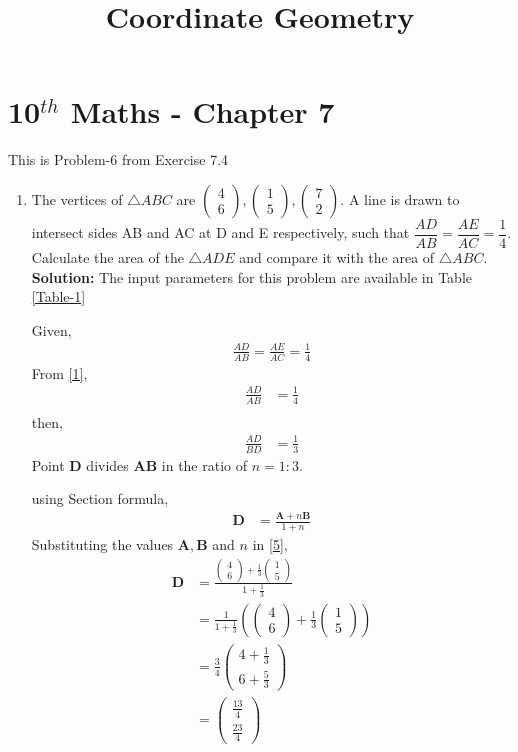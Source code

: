 \documentclass[12pt]{article}
\providecommand{\brak}[1]{\ensuremath{\left(#1\right)}}
\newcommand{\solution}{\noindent \textbf{Solution: }}
\newcommand{\myvec}[1]{\ensuremath{\begin{pmatrix}#1\end{pmatrix}}}
\let\vec\mathbf
\begin{document}
\begin{center}
\title{\textbf{Coordinate Geometry}}
\date{\vspace{-5ex}} %
\maketitle
\end{center}
\setcounter{page}{1}
\section*{10$^{th}$ Maths - Chapter 7}
This is Problem-6 from Exercise 7.4
\begin{enumerate}
\item The vertices of $\triangle ABC$ are $\myvec{4 \\ 6}, \myvec{1\\5}, \myvec{7\\2}$. A line is drawn to intersect sides AB and AC at D and E respectively, such that $\dfrac{AD}{AB}=\dfrac{AE}{AC}=\dfrac{1}{4}$. Calculate the area of the $\triangle ADE$ and compare it with the area of $\triangle ABC$.\\
\solution The input parameters for this problem are available in Table \eqref{Table-1}
\begin{table}[ht!]\centering

\caption{}
\label{Table-1}	
\end{table}


Given,
\begin{align}
\frac{AD}{AB}=\frac{AE}{AC}=\frac{1}{4}\label{1}
\end{align}
From \eqref{1},
\begin{align}
\frac{AD}{AB} &=\frac{1}{4}\\
\end{align}
then,
\begin{align}
\frac{AD}{BD} &=\frac{1}{3}
\end{align}
Point $\vec{D}$ divides $\vec{A}\vec{B}$ in the ratio of $n = 1:3$.

using Section formula,
\begin{align}
\vec{D} &=\frac{\vec{A}+n\vec{B}}{1+n}\label{5}
\end{align}
Substituting the values $\vec{A},\vec{B}$ and $n$ in \eqref{5},
\begin{align}
\vec{D} &=\frac{{\myvec{4\\6}+\frac{1}{3}\myvec{1\\5}}}{1+\frac{1}{3}}\\
	&=\frac{1}{1+\frac{1}{3}}\brak{{\myvec{4\\6}+\frac{1}{3}\myvec{1\\5}}} \\
	&=\frac{3}{4}\myvec{4+\frac{1}{3}\\[2pt]6+\frac{5}{3}}\\
	&=\myvec{\frac{13}{4}\\[2pt] \frac{23}{4}}
\end{align}


\end{enumerate}
\end{document}
